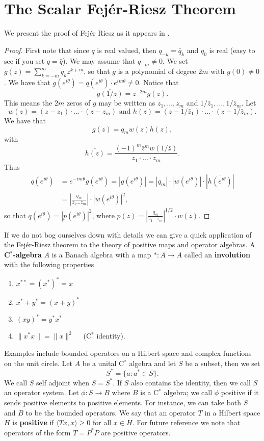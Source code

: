 \documentclass[12 pt]{article}
\theoremstyle{plain}
\theoremstyle{definition}
\newcommand{\ip}[2]{\langle #1, #2\rangle}
\begin{document}
\section{The Scalar Fej\'{e}r-Riesz Theorem}We present the proof of Fej\'{e}r Riesz as it appears in \cite{Paulsen}. 
\begin{proof}%
First note that since $q$ is real valued, then $q_{-k}=\bar{q}_k$ and $q_0$ is real (easy to see if you set $q=\bar{q}$). We may assume that $q_{-m}\neq 0$. We set $g(z)=\sum_{k=-m}^mq_kz^{k+m}$, so that $g$ is a polynomial of degree $2m$ with $g(0)\neq 0 $. We have that $g(e^{i\theta})=q(e^{i\theta})\cdot e^{im\theta}\neq0$.
Notice that 
\[\overline{g(1/\bar{z})}=z^{-2m}g(z).\]
This means the $2m$ zeros of $g$ may be written as $z_1,\ldots ,z_m$ and $1/\bar{z}_{1},\ldots ,1/\bar{z}_{m}.$ Let \[w(z)=(z-z_1)\cdot\ldots\cdot(z-z_m)\text{ and }h(z)=(z-1/\bar{z}_1)\cdot\ldots\cdot(z-1/\bar{z}_m).\] We have that 
\[g(z)=q_mw(z)h(z),\]
with 
\[\overline{h(z)}=\frac{(-1)^m\bar{z}^mw(1/\bar{z})}{z_1\cdot\ldots\cdot z_m}.\]
Thus
\begin{align*}
q(e^{i\theta})&=e^{-im\theta}g(e^{i\theta})=|g(e^{i\theta})|=|q_m|\cdot |w(e^{i\theta})|\cdot|\overline{h(e^{i\theta})}|\\
&=\left|\frac{q_m}{z_1\ldots z_m}\right| \cdot |w(e^{i\theta})|^2,
\end{align*}
so that $q(e^{i\theta})=|p(e^{i\theta})|^2$, where $p(z)=\left|\frac{q_m}{z_1\ldots z_m}\right|^{1/2} \cdot w(z)$.
\end{proof}
If we do not bog ourselves down with details we can give a quick application of the Fej\'{e}r-Riesz theorem to the theory of positive maps and operator algebras. A {\bf C$^*$-algebra} $A$ is a Banach algebra with a map $*:A\rightarrow A$ called an {\bf involution} with the following properties
\begin{enumerate}[1)]
\item $x^{**}=(x^*)^*=x$
\item $x^*+y^*=(x+y)^*$
\item$(xy)^*=y^*x^*$
\item $\|x^*x\|=\|x\|^2 $ \ \  (C$^*$ identity).
\end{enumerate}
Examples include bounded operators on a Hilbert space and complex functions on the unit circle. Let $A$ be a unital C$^*$ algebra and let $S$ be a subset, then we set 
\[S^*=\{a: a^*\in S\}.\]
We call $S$ self adjoint when $S=S^*$. If $S$ also contains the identity, then we call $S$ an operator system. Let $\phi:S\rightarrow B$ where $B$ is a C$^*$ algebra; we call $\phi$ positive if it sends positive elements to positive elements. For instance, we can take both $S$ and $B$ to be the bounded operators. We say that an operator $T$ in a Hilbert space $H$ is {\bf positive} if $\ip{Tx}{x}\geq 0$ for all $x\in H$. For future reference we note that operators of the form $T=P^*P$ are positive operators.
\end{document}
